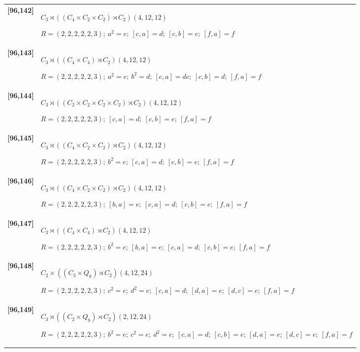 \documentclass[UTF8,fontset=fandol,11pt,a4paper]{ctexart}
\begin{document}
\begin{longtable}{@{}p{17mm}>{\raggedright\arraybackslash}p{141mm}@{}}
\textbf{[96,142]} & $C_{3}\rtimes ((C_{4}\times C_{2}\times C_{2})\rtimes C_{2})$\quad $(4,12,12)$\par\(R=(2,2,2,2,2,3);\allowbreak\ a^{2}=e;\allowbreak\ [c,a]=d;\allowbreak\ [c,b]=e;\allowbreak\ [f,a]=f\)\\[3pt]

\textbf{[96,143]} & $C_{3}\rtimes ((C_{4}\times C_{4})\rtimes C_{2})$\quad $(4,12,12)$\par\(R=(2,2,2,2,2,3);\allowbreak\ a^{2}=e;\allowbreak\ b^{2}=d;\allowbreak\ [c,a]=de;\allowbreak\ [c,b]=d;\allowbreak\ [f,a]=f\)\\[3pt]

\textbf{[96,144]} & $C_{3}\rtimes ((C_{2}\times C_{2}\times C_{2}\times C_{2})\rtimes C_{2})$\quad $(4,12,12)$\par\(R=(2,2,2,2,2,3);\allowbreak\ [c,a]=d;\allowbreak\ [c,b]=e;\allowbreak\ [f,a]=f\)\\[3pt]

\textbf{[96,145]} & $C_{3}\rtimes ((C_{4}\times C_{2}\times C_{2})\rtimes C_{2})$\quad $(4,12,12)$\par\(R=(2,2,2,2,2,3);\allowbreak\ b^{2}=e;\allowbreak\ [c,a]=d;\allowbreak\ [c,b]=e;\allowbreak\ [f,a]=f\)\\[3pt]

\textbf{[96,146]} & $C_{3}\rtimes ((C_{4}\times C_{2}\times C_{2})\rtimes C_{2})$\quad $(4,12,12)$\par\(R=(2,2,2,2,2,3);\allowbreak\ [b,a]=e;\allowbreak\ [c,a]=d;\allowbreak\ [c,b]=e;\allowbreak\ [f,a]=f\)\\[3pt]

\textbf{[96,147]} & $C_{3}\rtimes ((C_{4}\times C_{4})\rtimes C_{2})$\quad $(4,12,12)$\par\(R=(2,2,2,2,2,3);\allowbreak\ b^{2}=e;\allowbreak\ [b,a]=e;\allowbreak\ [c,a]=d;\allowbreak\ [c,b]=e;\allowbreak\ [f,a]=f\)\\[3pt]

\textbf{[96,148]} & $C_{2}\times ((C_{3}\times Q_{8})\rtimes C_{2})$\quad $(4,12,24)$\par\(R=(2,2,2,2,2,3);\allowbreak\ c^{2}=e;\allowbreak\ d^{2}=e;\allowbreak\ [c,a]=d;\allowbreak\ [d,a]=e;\allowbreak\ [d,c]=e;\allowbreak\ [f,a]=f\)\\[3pt]

\textbf{[96,149]} & $C_{3}\rtimes ((C_{2}\times Q_{8})\rtimes C_{2})$\quad $(2,12,24)$\par\(R=(2,2,2,2,2,3);\allowbreak\ b^{2}=e;\allowbreak\ c^{2}=e;\allowbreak\ d^{2}=e;\allowbreak\ [c,a]=d;\allowbreak\ [c,b]=e;\allowbreak\ [d,a]=e;\allowbreak\ [d,c]=e;\allowbreak\ [f,a]=f\)\\[3pt]


\end{longtable}
\end{document}
